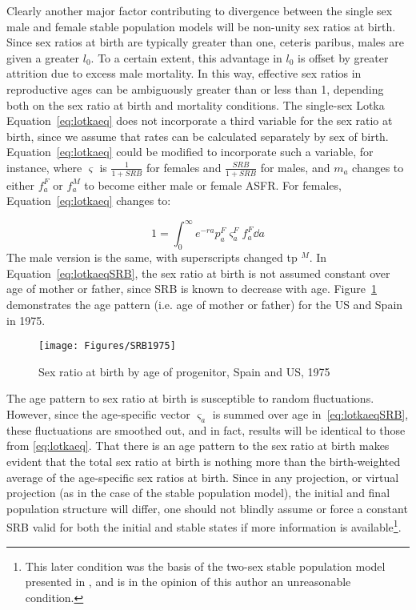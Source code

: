  \FloatBarrier
Clearly another major factor contributing to divergence between the single sex
male and female stable population models will be non-unity sex ratios at
birth. Since sex ratios at birth are typically greater than one, ceteris paribus, males
are given a greater $l_0$. To a certain extent, this advantage in $l_0$ is
offset by greater attrition due to excess male mortality. In this way, effective
sex ratios in reproductive ages can be ambiguously greater than or less than 1,
depending both on the sex ratio at birth and mortality conditions. The
single-sex Lotka Equation~\eqref{eq:lotkaeq} does not incorporate a third
variable for the sex ratio at birth, since we assume that rates can be
calculated separately by sex of birth. Equation~\eqref{eq:lotkaeq} could be
modified to incorporate such a variable, for instance, where $\varsigma$ is
$\tfrac{1}{1+SRB}$ for females and $\tfrac{SRB}{1+SRB}$ for males, and $m_a$
changes to either $f_a^F$ or $f_a^M$ to become either male or female ASFR. For
females, Equation~\ref{eq:lotkaeq} changes to:

\begin{equation}
\label{eq:lotkaeqSRB}
1 = \int _0 ^\infty e^{-ra}p_a^F \varsigma_a^F f_a^F \dd a 
\end{equation}
The male version is the same, with superscripts changed tp $^M$. In
Equation~\eqref{eq:lotkaeqSRB}, the sex ratio at birth is not assumed constant 
over age of mother or father, since SRB is known to decrease with age.
Figure~\ref{fig:SRB1975} demonstrates the age pattern (i.e. age of mother or
father) for the US and Spain in 1975.

\begin{figure}[ht!]
        \centering  
          \caption{Sex ratio at birth by age of progenitor, Spain
          and US, 1975}
           \texttt{[image: Figures/SRB1975]}
          \label{fig:SRB1975}
\end{figure}

The age pattern to sex ratio at birth is susceptible to random
fluctuations. However, since the age-specific vector $\varsigma _a$ is summed
over age in~\eqref{eq:lotkaeqSRB}, these fluctuations are smoothed out, and in
fact, results will be identical to those from \eqref{eq:lotkaeq}. That there is
an age pattern to the sex ratio at birth makes evident that the total sex ratio 
at birth is nothing more than the birth-weighted
average of the age-specific sex ratios at birth. Since in any projection, or virtual projection
(as in the case of the stable population model), the initial and final population 
structure will differ, one should not blindly assume or force a constant SRB valid 
for both the initial and stable states
if more information is available\footnote{This later condition was the basis of
the two-sex stable population model presented in \citet{mitra1982alternative,mitra1978derivation,mitra1976effect}, and is in the
opinion of this author an unreasonable condition.}.

